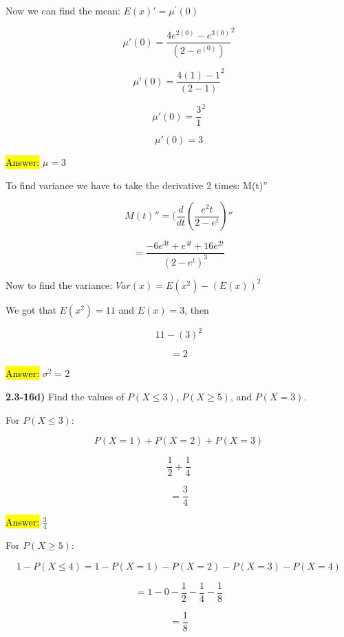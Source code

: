 \documentclass{article}
\begin{document}
Now we can find the mean: $E(x)'= \mu^{'}(0)$

$$\mu' (0)= \frac{4e^{2(0)}-e^{3(0)}}{(2-e^{(0)})}^{2}$$

$$\mu' (0)= \frac{4(1)-1}{(2-1)}^{2}$$

$$\mu' (0)=\frac{3}{1}^{2}$$

$$\mu' (0)= 3$$

\vspace{2mm}

\hl{Answer:} $\mu= 3$

\newpage

To find variance we have to take the derivative 2 times: M(t)''

$$ M(t)'' = (\frac{d}{dt}(\frac{e^2{t}}{2-e^{t}})'' $$

$$= \frac{-6e^{3t} + e^{4t} + 16e^{2t}}{(2-e^{t})^{3}} $$

Now to find the variance: $Var(x) =E(x^{2})-(E(x))^{2}$

\vspace{2mm}

We got that $E(x^{2})=11$ and $E(x)=3$, then

$$11-(3)^{2}$$

$$=2$$

\vspace{2mm}

\hl{Answer:} $\sigma^{2}= 2$


 
 \vspace{5mm}


\textbf{2.3-16d)} Find the values of $P(X \le 3)$, $P(X \ge 5)$, and $P(X=3)$.

\vspace{2mm}

For $P(X \le 3)$:

$$P(X=1) + P(X=2) + P(X=3)$$

$$\frac{1}{2} + \frac{1}{4} $$

$$=\frac{3}{4}$$ 

\vspace{2mm}

\hl{Answer:} $\frac{3}{4}$

\vspace{2mm}

For $P(X \ge 5)$:

$$1-P(X \le 4)=1-P(X=1) - P(X=2) - P(X=3) - P(X=4) $$

$$=1 - 0 - \frac{1}{2} -\frac{1}{4} -\frac{1}{8}$$

$$=\frac{1}{8}$$
\end{document}
